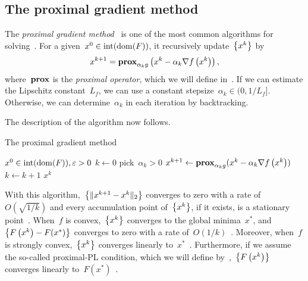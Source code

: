 \documentclass[../../main]{subfiles}
\begin{document}
\subsection{The proximal gradient method} 
The \emph{proximal gradient method}~\cite{Fukushima1981} is one of the most common algorithms for solving~.
For a given~$x^0 \in \interior (\dom (F))$, it recursively update~$\set*{x^k} $ by
\begin{equation}
    x^{k + 1} = \prox_{\alpha_k g} \left( x^k - \alpha_k \nabla f\left(x^k\right) \right)
    ,\end{equation}
where~$\prox$ is the \emph{proximal operator}, which we will define in~.
If we can estimate the Lipschitz constant~$L_f$, we can use a constant stepsize~$\alpha_k \in (0, 1 / L_f]$.
Otherwise, we can determine~$\alpha_k$ in each iteration by backtracking.

The description of the algorithm now follows.
\begin{algorithm}[hbtp]
    \caption{The proximal gradient method}
    \begin{algorithmic}[1]
        \Require $x^0 \in \interior (\dom (F)), \varepsilon > 0$
        \State $k \gets 0$
        \Repeat
        \State pick~$\alpha_k > 0$
        \State $x^{k + 1} \gets \prox_{\alpha_k g}(x^k - \alpha_k \nabla f\left(x^k\right))$
        \State $k \gets k + 1$
        \State \Return $x^k$
    \end{algorithmic}
\end{algorithm}

With this algorithm,~$\set*{\norm{x^{k + 1} - x^k}_2}$ converges to zero with a rate of~$O\left(\sqrt{1 / k}\right)$ and every accumulation point of~$\set*{x^k}$, if it exists, is a stationary point~\cite{Beck2017}.
When~$f$ is convex,~$\set*{x^k}$ converges to the global minima~$x^\ast$, and~$\set*{F\left(x^k\right) - F(x^\ast)}$ converges to zero with a rate of~$O(1 / k)$~\cite{Beck2017}.
Moreover, when~$f$ is strongly convex,~$\set*{x^k}$ converges linearly to~$x^\ast$~\cite{Beck2017}.
Furthermore, if we assume the so-called proximal-PL condition, which we will define by~,~$\set*{F\left(x^k\right)}$ converges linearly to~$F(x^\ast)$~\cite{Karimi2016}.
\end{document}
